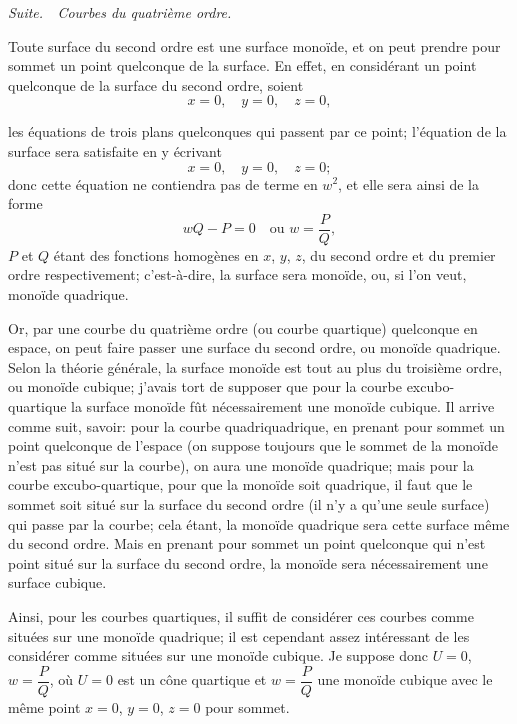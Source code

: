\documentclass[11pt,a4paper]{article}
\begin{document}
\medskip
\noindent\textit{Suite.\ \ Courbes du quatri\`{e}me ordre.}
\medskip

Toute surface du second ordre est une surface mono\"{i}de, et on peut prendre pour sommet un point quelconque de la surface. En effet, en consid\'{e}rant un point quelconque de la surface du second ordre, soient
\[
x = 0, \quad y = 0, \quad z = 0,
\]

\clearpage

les \'{e}quations de trois plans quelconques qui passent par ce point; l'\'{e}quation de la surface sera satisfaite en y \'{e}crivant
\[
x = 0, \quad y = 0, \quad z = 0;
\]
donc cette \'{e}quation ne contiendra pas de terme en $w^2$, et elle sera ainsi de la forme
\[
wQ - P = 0 \quad \text{ou } w = \frac{P}{Q},
\]
$P$ et $Q$ \'{e}tant des fonctions homog\`{e}nes en $x$, $y$, $z$, du second ordre et du premier ordre respectivement; c'est-\`{a}-dire, la surface sera mono\"{i}de, ou, si l'on veut, mono\"{i}de quadrique.

Or, par une courbe du quatri\`{e}me ordre (ou courbe quartique) quelconque en espace, on peut faire passer une surface du second ordre, ou mono\"{i}de quadrique. Selon la th\'{e}orie g\'{e}n\'{e}rale, la surface mono\"{i}de est tout au plus du troisi\`{e}me ordre, ou mono\"{i}de cubique; j'avais tort de supposer que pour la courbe excubo-quartique la surface mono\"{i}de f\^{u}t n\'{e}cessairement une mono\"{i}de cubique. Il arrive comme suit, savoir: pour la courbe quadriquadrique, en prenant pour sommet un point quelconque de l'espace (on suppose toujours que le sommet de la mono\"{i}de n'est pas situ\'{e} sur la courbe), on aura une mono\"{i}de quadrique; mais pour la courbe excubo-quartique, pour que la mono\"{i}de soit quadrique, il faut que le sommet soit situ\'{e} sur la surface du second ordre (il n'y a qu'une seule surface) qui passe par la courbe; cela \'{e}tant, la mono\"{i}de quadrique sera cette surface m\^{e}me du second ordre. Mais en prenant pour sommet un point quelconque qui n'est point situ\'{e} sur la surface du second ordre, la mono\"{i}de sera n\'{e}cessairement une surface cubique.

Ainsi, pour les courbes quartiques, il suffit de consid\'{e}rer ces courbes comme situ\'{e}es sur une mono\"{i}de quadrique; il est cependant assez int\'{e}ressant de les consid\'{e}rer comme situ\'{e}es sur une mono\"{i}de cubique. Je suppose donc $U = 0$, $w = \dfrac{P}{Q}$, o\`{u} $U = 0$ est un c\^{o}ne quartique et $w = \dfrac{P}{Q}$ une mono\"{i}de cubique avec le m\^{e}me point $x = 0$, $y = 0$, $z = 0$ pour sommet.
\end{document}
